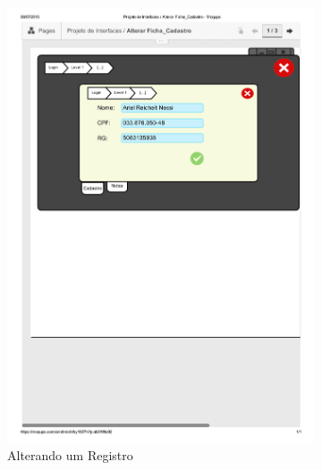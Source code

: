 \documentclass[12pt]{article}
\begin{document}
\begin{figure}[h]
\begin{subfigure}{0.5\textwidth}
\centering
\includegraphics[scale=0.3]{imagens/Alterar_Ficha_Cadastro.pdf}
\caption{Alterando um Registro}
\label{alterar_ficha_cadastro}
\end{subfigure}
\begin{subfigure}{0.5\textwidth}

\end{subfigure}
\end{figure}
\end{document}
